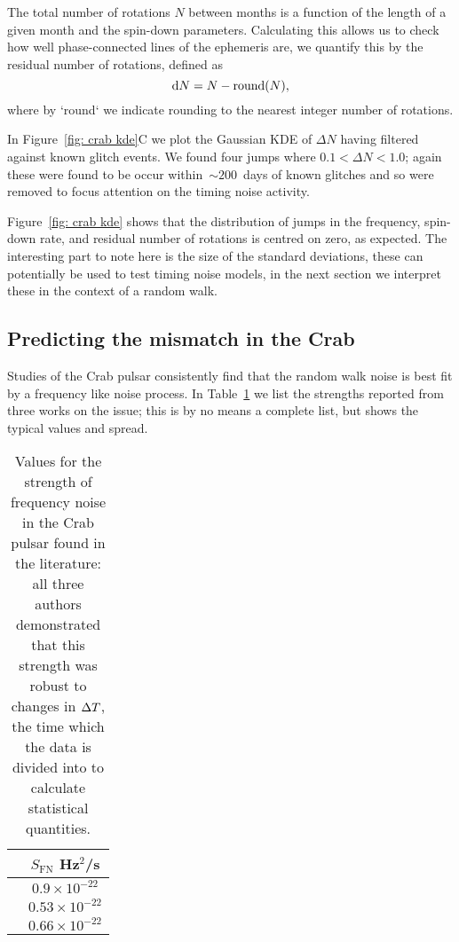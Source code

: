 \documentclass[../full_thesis/full_thesis.tex]{subfiles}
\begin{document}
{The total number of rotations $N$ between months is a function of
the length of a given month and the spin-down parameters. Calculating this
allows us to check how well phase-connected lines of the ephemeris are,
we quantify this by the residual number of rotations, defined as
\begin{equation}
\mathrm{d} N = N - \textrm{round}(N),
\end{equation}
where by `round` we indicate rounding to the nearest integer number of rotations.

In Figure~\ref{fig: crab kde}C we plot the Gaussian KDE of $\Delta N$ having filtered
against known glitch events. We found four jumps where $0.1 < \Delta N < 1.0$;
again these were found to be occur within~$\sim200$~days of known glitches and
so were removed to focus attention on the timing noise activity.

Figure~\ref{fig: crab kde} shows that the distribution of jumps in the frequency,
spin-down rate, and residual number of rotations is centred on zero, as
expected. The interesting part to note here is the size of the standard deviations,
these can potentially be used to test timing noise models, in the next section
we interpret these in the context of a random walk.

\subsection{Predicting the mismatch in the Crab}

Studies of the Crab pulsar consistently find that the random walk noise is
best fit by a frequency like noise process. In Table~\ref{tab: SFN lit} we list
the strengths reported from three works on the issue; this is by no means a
complete list, but shows the typical values and spread.
\begin{table}[htb]
\centering
\begin{tabular}{c|c}
 & $S_{\textrm{FN}}$ Hz$^{2}$/s\\ \hline
\citet{Boynton1972} & $0.9\times10^{-22}$\\
\citet{Groth1975} & $ 0.53\times10^{-22}$\\
\citet{Cordes1980} & $0.66\times10^{-22}$
\end{tabular}
\caption{Values for the strength of frequency noise in the Crab pulsar found
         in the literature: all three authors demonstrated that this strength
         was robust to changes in $\Delta T$, the time which the data is divided into
         to calculate statistical quantities.}
\label{tab: SFN lit}
\end{table}

}
\end{document}
